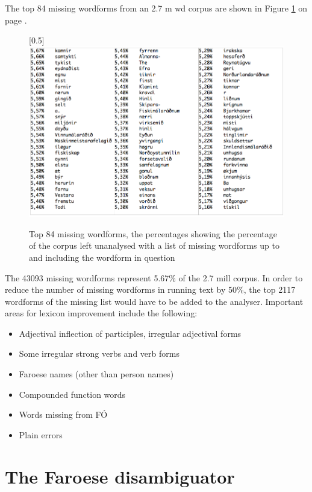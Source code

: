 \documentclass[11pt]{article}
\begin{document}
The top 84 missing wordforms from an 2.7 m wd corpus are shown in Figure \ref{84miss} on page \pageref{84miss}. 

\begin{figure}[htbp]
\begin{center}
\scalebox{0.5}[0.5]{\includegraphics{img/missing.png}}
\caption{Top 84 missing wordforms, the percentages showing the percentage of the corpus left unanalysed with a list of missing wordforms up to and including the wordform in question}
\label{84miss}
\end{center}
\end{figure}


The 43093 missing wordforms represent 5.67\% of the 2.7 mill corpus. In order to reduce the number of missing wordforms in running text by 50\%, the top 2117 wordforms of the missing list would have to be added to the analyser. Important areas for lexicon improvement include the following:

\begin{itemize}
\setlength{\itemsep}{-0.2cm}
\item Adjectival inflection of participles, irregular adjectival forms
\item Some irregular strong verbs and verb forms
\item Faroese names (other than person names)
\item Compounded function words
\item Words missing from FÓ
\item Plain errors
\end{itemize}




\section{The Faroese disambiguator}
\end{document}
